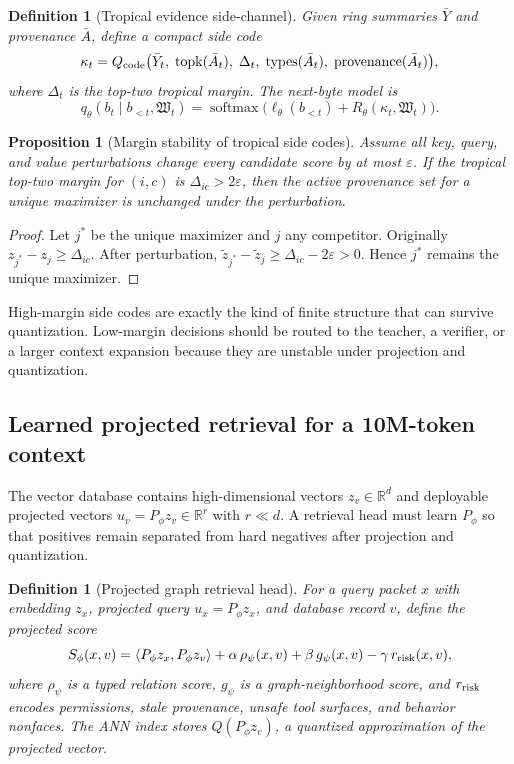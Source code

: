 \documentclass[11pt]{article}
\newtheorem{proposition}[theorem]{Proposition}
\newtheorem{definition}[theorem]{Definition}
\newcommand{\RR}{\mathbb{R}}
\newcommand{\softmax}{\operatorname{softmax}}
\newcommand{\eps}{\varepsilon}
\numberwithin{equation}{section}
\begin{document}
\begin{definition}[Tropical evidence side-channel]
Given ring summaries $\bar Y$ and provenance $\bar A$, define a compact side code
\begin{equation}
\kappa_t=Q_{\rm code}\big(\bar Y_t,\;\mathrm{topk}(\bar A_t),\;\Delta_t,\;\mathrm{types}(\bar A_t),\;\mathrm{provenance}(\bar A_t)\big),
\end{equation}
where $\Delta_t$ is the top-two tropical margin. The next-byte model is
\begin{equation}
q_\theta(b_t\mid b_{<t},\mathfrak{W}_t)=\softmax\big(\ell_\theta(b_{<t})+R_\theta(\kappa_t,\mathfrak{W}_t)\big).
\end{equation}
\end{definition}

\begin{proposition}[Margin stability of tropical side codes]
Assume all key, query, and value perturbations change every candidate score by at most $\eps$. If the tropical top-two margin for $(i,c)$ is $\Delta_{ic}>2\eps$, then the active provenance set for a unique maximizer is unchanged under the perturbation.
\end{proposition}
\begin{proof}
Let $j^*$ be the unique maximizer and $j$ any competitor. Originally $z_{j^*}-z_j\ge \Delta_{ic}$. After perturbation, $\tilde z_{j^*}-\tilde z_j\ge \Delta_{ic}-2\eps>0$. Hence $j^*$ remains the unique maximizer.
\end{proof}

High-margin side codes are exactly the kind of finite structure that can survive quantization. Low-margin decisions should be routed to the teacher, a verifier, or a larger context expansion because they are unstable under projection and quantization.

\subsection{Learned projected retrieval for a 10M-token context}
The vector database contains high-dimensional vectors $z_v\in\RR^d$ and deployable projected vectors $u_v=P_\phi z_v\in\RR^r$ with $r\ll d$. A retrieval head must learn $P_\phi$ so that positives remain separated from hard negatives after projection and quantization.

\begin{definition}[Projected graph retrieval head]
For a query packet $x$ with embedding $z_x$, projected query $u_x=P_\phi z_x$, and database record $v$, define the projected score
\begin{equation}
S_\phi(x,v)=\langle P_\phi z_x, P_\phi z_v\rangle + \alpha\,\rho_\psi(x,v)+\beta\,g_\psi(x,v)-\gamma\,r_{\rm risk}(x,v),
\end{equation}
where $\rho_\psi$ is a typed relation score, $g_\psi$ is a graph-neighborhood score, and $r_{\rm risk}$ encodes permissions, stale provenance, unsafe tool surfaces, and behavior nonfaces. The ANN index stores $Q(P_\phi z_v)$, a quantized approximation of the projected vector.
\end{definition}
\end{document}
